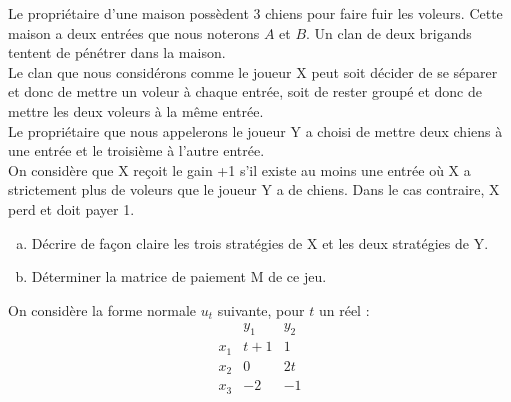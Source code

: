 \documentclass[french,11pt,leqno]{article}
\newcounter{exocount}
\newcounter{questcount}
\def\exo{\bigskip\noindent{\bf Exercice \theexocount {} -}
  \addtocounter{exocount}{1} \setcounter{questcount}{1}}
\begin{document}
\exo
Le propri\'etaire d'une maison poss\`edent 3 chiens pour faire fuir les voleurs. 
Cette maison a deux entr\'ees que nous noterons $A$ et $B$. Un clan de deux brigands tentent de p\'en\'etrer dans la maison.\\
Le clan que nous consid\'erons comme le joueur X peut soit d\'ecider de se s\'eparer et donc de mettre un voleur \`a chaque entr\'ee, soit de rester 
group\'e et donc de mettre les deux voleurs \`a la m\^eme entr\'ee.\\ 
Le propri\'etaire que nous appelerons le joueur Y a choisi de mettre deux chiens \`a une entr\'ee et le troisi\`eme \`a l'autre entr\'ee.\\ 
On consid\`ere que X re\c coit le gain +1 s'il existe au moins une entr\'ee o\`u X a strictement plus de voleurs que le joueur Y a de chiens. 
Dans le cas contraire, X perd et doit payer 1.
\begin{enumerate}[a)]
\item D\'ecrire de fa\c con claire les trois strat\'egies de X et les deux strat\'egies de Y.
\item D\'eterminer la matrice de paiement M de ce jeu. 
\end{enumerate}


\exo 
On consid\`ere la forme normale $u_t$ suivante, pour $t$ un r\'eel :
\begin{equation*}
 \begin{array}{l|rr}
     & y_1 & y_2  \\ \hline
 x_1 & t+1&1\\
 x_2 & 0&2t\\
 x_3 & -2&-1
 \end{array}
%
% 
% 
%
%
\end{equation*}
\end{document}
